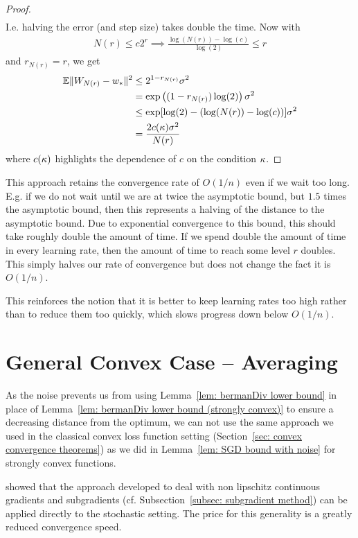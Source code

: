 \begin{proof}
\begin{align*}
	\end{align*}
	I.e. halving the error (and step size) takes double the time. Now with
	\begin{align*}
		N(r) \le c2^r \implies \frac{\log(N(r)) - \log(c)}{\log(2)} \le r
	\end{align*}
	and \(r_{N(r)} = r\), we get
	\begin{align*}
		\mathbb{E}\|W_{N(r)}-w_*\|^2 
		&\le 2^{1-r_{N(r)}}\sigma^2\\
		&= \exp\left((1-r_{N(r)})\log(2)\right)\sigma^2\\
		&\le \exp[\log(2)- (\log(N(r)) - \log(c))]\sigma^2\\
		&=  \frac{2c(\kappa)\sigma^2}{N(r)}
	\end{align*}
	where \(c(\kappa)\) highlights the dependence of \(c\) on the condition
	\(\kappa\).
\end{proof}

This approach retains the convergence rate of \(O(1/n)\) even if we wait too long.
E.g. if we do not wait until we are at twice the asymptotic bound, but \(1.5\)
times the asymptotic bound, then this represents a halving of the distance to
the asymptotic bound. Due to exponential convergence to this bound, this should
take roughly double the amount of time. If we spend double the amount of time in
every learning rate, then the amount of time to reach some level \(r\) doubles.
This simply halves our rate of convergence but does not change the fact it is
\(O(1/n)\).

This reinforces the notion that it is better to keep learning rates too high
rather than to reduce them too quickly, which slows progress down below \(O(1/n)\).

\section{General Convex Case -- Averaging}\label{sec: SGD with Averaging}

As the noise prevents us from using Lemma~\ref{lem: bermanDiv lower bound} in
place of Lemma~\ref{lem: bermanDiv lower bound (strongly convex)} to ensure a
decreasing distance from the optimum, we can not use the same approach we used
in the classical convex loss function setting (Section~\ref{sec: convex convergence theorems})
as we did in Lemma~\ref{lem: SGD bound with noise} for strongly convex functions.

\textcite{nemirovskiRobustStochasticApproximation2009} showed that the approach
developed to deal with non lipschitz continuous gradients and subgradients (cf.
Subsection~\ref{subsec: subgradient method}) can be applied directly to the
stochastic setting. The price for this generality is a greatly reduced
convergence speed.

